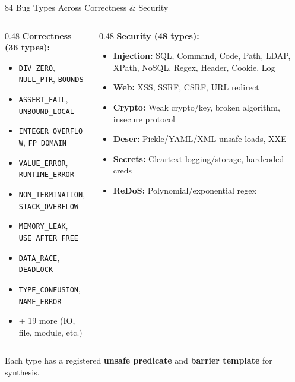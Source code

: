 \documentclass[aspectratio=169]{beamer}
\begin{document}
\begin{frame}{84 Bug Types Across Correctness \& Security}

\begin{columns}[T]
\begin{column}{0.48\textwidth}
\textbf{Correctness (36 types):}
\begin{itemize}\setlength\itemsep{0pt}
  \item \texttt{DIV\_ZERO}, \texttt{NULL\_PTR}, \texttt{BOUNDS}
  \item \texttt{ASSERT\_FAIL}, \texttt{UNBOUND\_LOCAL}
  \item \texttt{INTEGER\_OVERFLOW}, \texttt{FP\_DOMAIN}
  \item \texttt{VALUE\_ERROR}, \texttt{RUNTIME\_ERROR}
  \item \texttt{NON\_TERMINATION}, \texttt{STACK\_OVERFLOW}
  \item \texttt{MEMORY\_LEAK}, \texttt{USE\_AFTER\_FREE}
  \item \texttt{DATA\_RACE}, \texttt{DEADLOCK}
  \item \texttt{TYPE\_CONFUSION}, \texttt{NAME\_ERROR}
  \item + 19 more (IO, file, module, etc.)
\end{itemize}
\end{column}
\begin{column}{0.48\textwidth}
\textbf{Security (48 types):}
\begin{itemize}\setlength\itemsep{0pt}
  \item \textbf{Injection:} SQL, Command, Code, Path, LDAP, XPath, NoSQL, Regex, Header, Cookie, Log
  \item \textbf{Web:} XSS, SSRF, CSRF, URL redirect
  \item \textbf{Crypto:} Weak crypto/key, broken algorithm, insecure protocol
  \item \textbf{Deser:} Pickle/YAML/XML unsafe loads, XXE
  \item \textbf{Secrets:} Cleartext logging/storage, hardcoded creds
  \item \textbf{ReDoS:} Polynomial/exponential regex
\end{itemize}
\end{column}
\end{columns}

\vspace{0.3em}
Each type has a registered \textbf{unsafe predicate} and \textbf{barrier template} for synthesis.

\end{frame}
\end{document}
